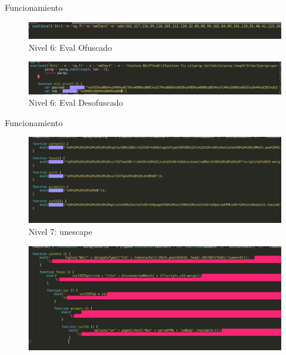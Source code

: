\documentclass[aspectratio=169]{beamer}
\begin{document}
  	\begin{frame}{Funcionamiento}
	\begin{figure}[H]
		\centering
		\includegraphics[width=15cm]{images/level6.png}
		\caption{Nivel 6: Eval Ofuscado} 
	\end{figure}
	
	\begin{figure}[H]
		\centering
		\includegraphics[width=15cm]{images/level6_after.png}
		\caption{Nivel 6: Eval Desofuscado} 
	\end{figure}
  	\end{frame}
  	
  	\begin{frame}{Funcionamiento}
	\begin{figure}[H]
		\centering
		\includegraphics[width=12cm]{images/level7.png}
		\caption{Nivel 7: unescape } 
	\end{figure}
	
	\begin{figure}[H]
		\centering
		\includegraphics[width=12cm]{images/level7_after.png}
	\end{figure}
  	\end{frame}
  	
\end{document}
